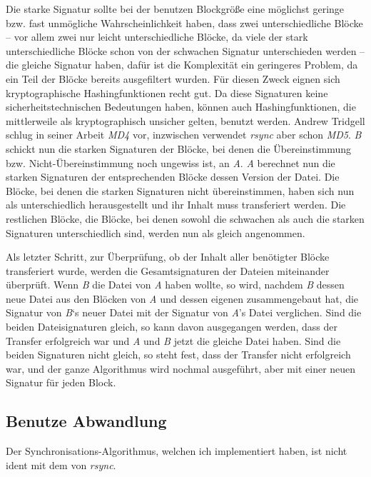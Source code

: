 Die starke Signatur sollte bei der benutzen Blockgröße eine möglichst geringe bzw. fast unmögliche Wahrscheinlichkeit haben, dass zwei unterschiedliche Blöcke
-- vor allem zwei nur leicht unterschiedliche Blöcke, da viele der stark unterschiedliche Blöcke schon von der schwachen Signatur unterschieden werden -- die
gleiche Signatur haben, dafür ist die Komplexität ein geringeres Problem, da ein Teil der Blöcke bereits ausgefiltert wurden. Für diesen Zweck eignen sich 
kryptographische Hashingfunktionen recht gut. Da diese Signaturen keine sicherheitstechnischen Bedeutungen haben, können auch Hashingfunktionen, die mittlerweile
als kryptographisch unsicher gelten, benutzt werden. Andrew Tridgell schlug in seiner Arbeit \textit{MD4} vor\cite{Tridgell99}, inzwischen verwendet 
\textit{rsync} aber schon \textit{MD5}\cite{rsync}\cite{wiki_rsync}. \emph{B} schickt nun die starken Signaturen der Blöcke, bei denen die Übereinstimmung bzw.
Nicht-Übereinstimmung noch ungewiss ist, an \emph{A}. \emph{A} berechnet nun die starken Signaturen der entsprechenden Blöcke dessen Version der Datei. 
Die Blöcke, bei denen die starken Signaturen nicht übereinstimmen, haben sich nun als unterschiedlich herausgestellt und ihr Inhalt muss transferiert werden.
Die restlichen Blöcke, die Blöcke, bei denen sowohl die schwachen als auch die starken Signaturen unterschiedlich sind, werden nun als gleich angenommen.

Als letzter Schritt, zur Überprüfung, ob der Inhalt aller benötigter Blöcke transferiert wurde, werden die Gesamtsignaturen der Dateien miteinander
überprüft. Wenn \emph{B} die Datei von \emph{A} haben wollte, so wird, nachdem \emph{B} dessen neue Datei aus den Blöcken von \emph{A} und dessen eigenen
zusammengebaut hat, die Signatur von \emph{B}`s neuer Datei mit der Signatur von \emph{A}'s Datei verglichen. Sind die beiden Dateisignaturen gleich, so
kann davon ausgegangen werden, dass der Transfer erfolgreich war und \emph{A} und \emph{B} jetzt die gleiche Datei haben. Sind die beiden Signaturen
nicht gleich, so steht fest, dass der Transfer nicht erfolgreich war, und der ganze Algorithmus wird nochmal ausgeführt, aber mit einer neuen Signatur für
jeden Block.

\subsection{Benutze Abwandlung}

Der Synchronisations-Algorithmus, welchen ich implementiert haben, ist nicht ident mit dem von \textit{rsync}.

